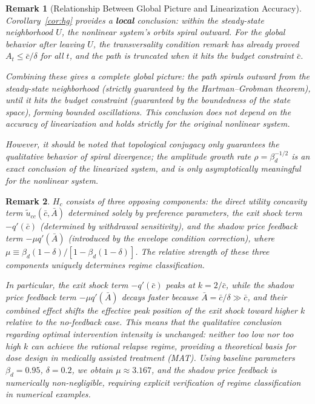 \documentclass[12pt]{article}
\newtheorem{remark}{Remark}
\begin{document}
\begin{remark}[Relationship Between Global Picture and Linearization Accuracy]
    Corollary~\ref{cor:hg} provides a \textbf{local} conclusion: within the steady-state neighborhood $U$,
    the nonlinear system's orbits spiral outward.
    For the global behavior after leaving $U$, the transversality condition remark has already proved
    $A_t\leq\bar{c}/\delta$ for all $t$,
    and the path is truncated when it hits the budget constraint $\bar{c}$.
 
    Combining these gives a complete global picture:
    the path spirals outward from the steady-state neighborhood (strictly guaranteed by the Hartman--Grobman theorem),
    until it hits the budget constraint (guaranteed by the boundedness of the state space), forming bounded oscillations.
    This conclusion does not depend on the accuracy of linearization and holds strictly for the original nonlinear system.
 
    However, it should be noted that topological conjugacy only guarantees the qualitative behavior of spiral divergence;
    the amplitude growth rate $\rho=\beta_d^{-1/2}$ is an exact conclusion of the linearized system,
    and is only asymptotically meaningful for the nonlinear system.
\end{remark}

\begin{remark}
$H_c$ consists of three opposing components: the direct utility concavity term $\tilde{u}_{cc}(\bar{c},\bar{A})$ determined solely by preference parameters, the exit shock term
$-q'(\bar{c})$ (determined by withdrawal sensitivity), and the shadow price feedback term
$-\mu q'(\bar{A})$ (introduced by the envelope condition correction), where
$\mu \equiv \beta_d(1-\delta)/[1-\beta_d(1-\delta)]$. The relative strength of these three components uniquely determines regime classification.

In particular, the exit shock term $-q'(\bar{c})$ peaks at $k = 2/\bar{c}$, while the shadow price feedback term
$-\mu q'(\bar{A})$ decays faster because $\bar{A} = \bar{c}/\delta \gg \bar{c}$, and their combined effect shifts
the effective peak position of the exit shock toward higher $k$ relative to the no-feedback case. This means that the
qualitative conclusion regarding optimal intervention intensity is unchanged: neither too low nor too high $k$ can achieve the rational relapse regime, providing a theoretical basis for dose design in medically assisted treatment (MAT).
Using baseline parameters $\beta_d = 0.95$, $\delta = 0.2$, we obtain $\mu \approx 3.167$,
and the shadow price feedback is numerically non-negligible, requiring explicit verification of regime classification in numerical examples.
\end{remark}
\end{document}
